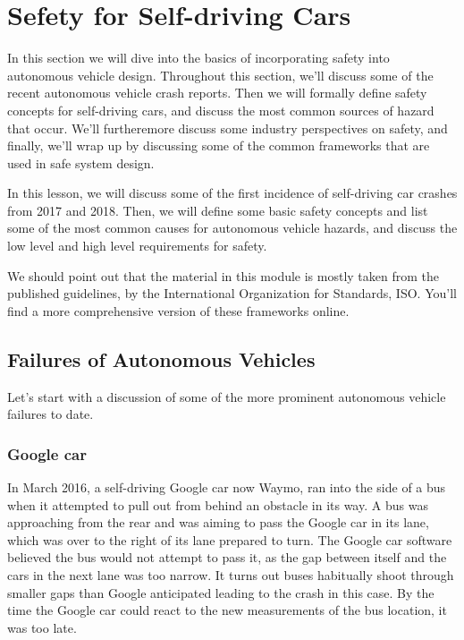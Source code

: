 \section{Sefety for Self-driving Cars}
\label{safety_for_self_driving_cars}
In this section we will dive into the basics of incorporating safety into autonomous vehicle design. 
Throughout this section, we'll discuss some of the recent autonomous vehicle crash reports. 
Then we will formally define safety concepts for self-driving cars, and discuss the most common sources of hazard that occur. 
We'll furtheremore discuss some industry perspectives on safety, and finally, we'll wrap up by discussing some of the common frameworks that are used in safe system design. 


In this lesson, we will discuss some of the first incidence of self-driving car crashes from 2017 and 2018. 
Then, we will define some basic safety concepts and list some of the most common causes for autonomous vehicle hazards, and discuss the low level and high level requirements for safety. 

We should point out that the material in this module is mostly taken from the published guidelines, by the International Organization for Standards, ISO. 
You'll find a more comprehensive version of these frameworks online. 

\subsection{Failures of Autonomous Vehicles}

Let's start with a discussion of some of the more prominent autonomous vehicle failures to date. 

\subsubsection{Google car}

In March 2016, a self-driving Google car now Waymo, 
ran into the side of a bus when it attempted to pull out from behind an obstacle in its way. 
A bus was approaching from the rear and was aiming to pass the Google car in its lane, 
which was over to the right of its lane prepared to turn. 
The Google car software believed the bus would not attempt to pass it, as the gap between itself and the cars in the next lane was too narrow. 
It turns out buses habitually shoot through smaller gaps than Google anticipated leading to the crash in this case. 
By the time the Google car could react to the new measurements of the bus location, it was too late. 

